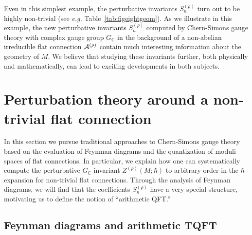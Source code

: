 \documentclass[hyper]{JHEP3}
\def\CA {{\cal A}}
\newcommand{\C}{{\mathbb{C}}}
\begin{document}
Even in this simplest example,
the perturbative invariants $S_{n}^{(\rho)}$ turn out to be highly non-trivial
(see {\it e.g.} Table~\ref{tab:figeightgeom}).
As we illustrate in this example, the new perturbative invariants $S_{n}^{(\rho)}$
computed by Chern-Simons gauge theory with complex gauge group $G_{\C}$
in the background of a non-abelian irreducible flat connection $\CA^{(\rho)}$
contain much interesting information about the geometry of $M$.
We believe that studying these invariants further, both physically
and mathematically, can lead to exciting developments in both subjects.


\section{Perturbation theory around a non-trivial flat connection}
\label{sec:pert}

In this section we pursue traditional approaches to Chern-Simons gauge theory
based on the evaluation of Feynman diagrams and the quantization of moduli spaces
of flat connections.
In particular, we explain how one can systematically compute the perturbative
$G_{\C}$ invariant $Z^{(\rho)} (M;\hbar)$ to arbitrary order in the $\hbar$-expansion
for non-trivial flat connections.
Through the analysis of Feynman diagrams, we will find that
the coefficients $S_n^{(\rho)}$ have a very special structure,
motivating us to define the notion of ``arithmetic QFT.''



\subsection{Feynman diagrams and arithmetic TQFT}
\label{sec:loops}
\end{document}
